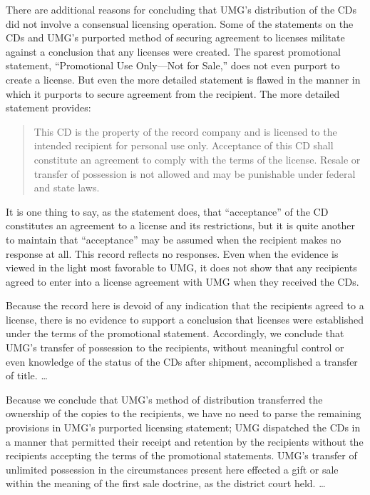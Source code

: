 There are additional reasons for concluding that UMG's distribution of the CDs
did not involve a consensual licensing operation. Some of the statements on the
CDs and UMG's purported method of securing agreement to licenses militate
against a conclusion that any licenses were created. The sparest promotional
statement, ``Promotional Use Only---Not for Sale,'' does not even purport to
create a license. But even the more detailed statement is flawed in the manner
in which it purports to secure agreement from the recipient. The more detailed
statement provides:

\begin{quote}
This CD is the property of the record company and is licensed to the intended
recipient for personal use only. Acceptance of this CD shall constitute an
agreement to comply with the terms of the license. Resale or transfer of
possession is not allowed and may be punishable under federal and state laws.
\end{quote}

It is one thing to say, as the statement does, that ``acceptance'' of the CD
constitutes an agreement to a license and its restrictions, but it is quite
another to maintain that ``acceptance'' may be assumed when the recipient makes
no response at all. This record reflects no responses. Even when the evidence
is viewed in the light most favorable to UMG, it does not show that any
recipients agreed to enter into a license agreement with UMG when they received
the CDs.

Because the record here is devoid of any indication that the recipients agreed
to a license, there is no evidence to support a conclusion that licenses were
established under the terms of the promotional statement. Accordingly, we
conclude that UMG's transfer of possession to the recipients, without
meaningful control or even knowledge of the status of the CDs after shipment,
accomplished a transfer of title. {\dots}

Because we conclude that UMG's method of distribution transferred the ownership
of the copies to the recipients, we have no need to parse the remaining
provisions in UMG's purported licensing statement; UMG dispatched the CDs in a
manner that permitted their receipt and retention by the recipients without the
recipients accepting the terms of the promotional statements. UMG's transfer of
unlimited possession in the circumstances present here effected a gift or sale
within the meaning of the first sale doctrine, as the district court held.
{\dots}

